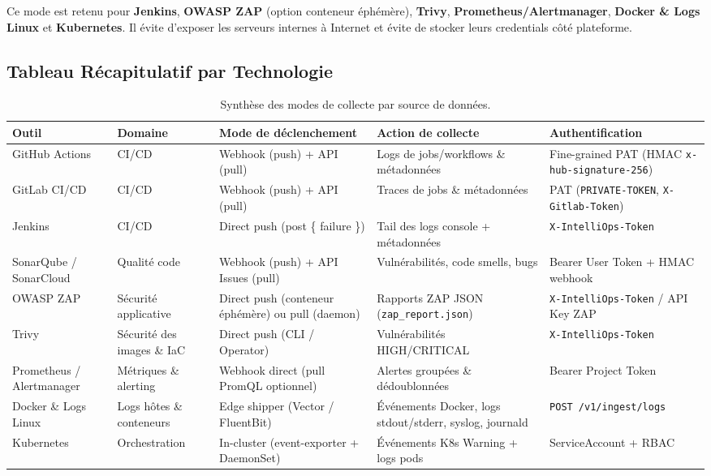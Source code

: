 \documentclass[12pt,a4paper]{article}
\newcommand{\code}[1]{\texttt{#1}}
\begin{document}
Ce mode est retenu pour \textbf{Jenkins}, \textbf{OWASP ZAP} (option conteneur éphémère), \textbf{Trivy}, \textbf{Prometheus/Alertmanager}, \textbf{Docker \& Logs Linux} et \textbf{Kubernetes}. Il évite d'exposer les serveurs internes à Internet et évite de stocker leurs credentials côté plateforme.

\subsection{Tableau Récapitulatif par Technologie}

\begin{table}[H]
\centering
\small
\begin{tabular}{@{}p{2.6cm}p{2.6cm}p{2.6cm}p{4.6cm}p{3.2cm}@{}}
\toprule
\textbf{Outil} & \textbf{Domaine} & \textbf{Mode de déclenchement} & \textbf{Action de collecte} & \textbf{Authentification} \\
\midrule
GitHub Actions & CI/CD & Webhook (push) + API (pull) & Logs de jobs/workflows \& métadonnées & Fine-grained PAT (HMAC \code{x-hub-signature-256}) \\
GitLab CI/CD & CI/CD & Webhook (push) + API (pull) & Traces de jobs \& métadonnées & PAT (\code{PRIVATE-TOKEN}, \code{X-Gitlab-Token}) \\
Jenkins & CI/CD & Direct push (post \{ failure \}) & Tail des logs console + métadonnées & \code{X-IntelliOps-Token} \\
SonarQube / SonarCloud & Qualité code & Webhook (push) + API Issues (pull) & Vulnérabilités, code smells, bugs & Bearer User Token + HMAC webhook \\
OWASP ZAP & Sécurité applicative & Direct push (conteneur éphémère) ou pull (daemon) & Rapports ZAP JSON (\code{zap\_report.json}) & \code{X-IntelliOps-Token} / API Key ZAP \\
Trivy & Sécurité des images \& IaC & Direct push (CLI / Operator) & Vulnérabilités HIGH/CRITICAL & \code{X-IntelliOps-Token} \\
Prometheus / Alertmanager & Métriques \& alerting & Webhook direct (pull PromQL optionnel) & Alertes groupées \& dédoublonnées & Bearer Project Token \\
Docker \& Logs Linux & Logs hôtes \& conteneurs & Edge shipper (Vector / FluentBit) & Événements Docker, logs stdout/stderr, syslog, journald & \code{POST /v1/ingest/logs} \\
Kubernetes & Orchestration & In-cluster (event-exporter + DaemonSet) & Événements K8s Warning + logs pods & ServiceAccount + RBAC \\
\bottomrule
\end{tabular}
\caption{Synthèse des modes de collecte par source de données.}
\label{tab:synthese}
\end{table}
\end{document}
